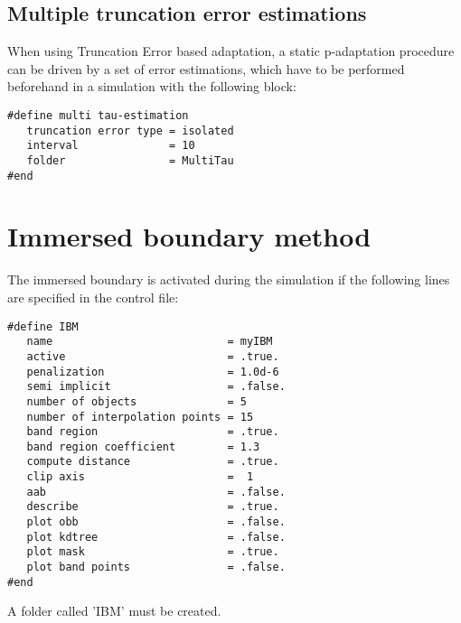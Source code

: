 \documentclass[a4paper,10pt]{report}
\begin{document}
\section{Multiple truncation error estimations} \label{sec:MultiTau}
When using Truncation Error based adaptation, a static p-adaptation procedure can be driven by a set of error estimations, which have to be performed beforehand in a simulation with the following block:

\begin{lstlisting}
#define multi tau-estimation
   truncation error type = isolated
   interval              = 10
   folder                = MultiTau
#end
\end{lstlisting}


\chapter{Immersed boundary method}

The immersed boundary is activated during the simulation if the following lines are specified in the control file:
\begin{lstlisting}
#define IBM
   name                           = myIBM
   active                         = .true.
   penalization                   = 1.0d-6
   semi implicit                  = .false.
   number of objects              = 5 
   number of interpolation points = 15
   band region                    = .true.
   band region coefficient        = 1.3
   compute distance               = .true.
   clip axis                      =  1
   aab                            = .false.
   describe                       = .true.
   plot obb                       = .false.
   plot kdtree                    = .false.
   plot mask                      = .true.
   plot band points               = .false.
#end
\end{lstlisting}

A folder called 'IBM' must be created.
\end{document}
